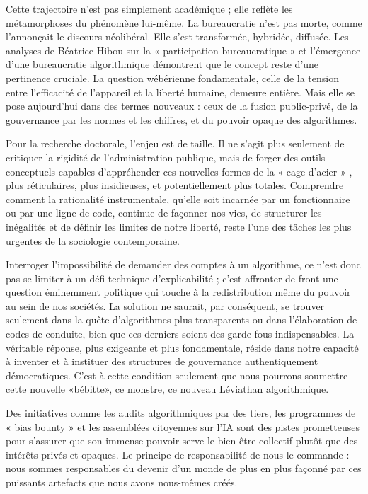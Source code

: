 Cette trajectoire n'est pas simplement académique ; elle reflète les métamorphoses du phénomène lui-même. La bureaucratie n'est pas morte, comme l'annonçait le discours néolibéral. Elle s'est transformée, hybridée, diffusée. Les analyses de Béatrice Hibou sur la « participation bureaucratique »  et l'émergence d'une bureaucratie algorithmique démontrent que le concept reste d'une pertinence cruciale. La question wébérienne fondamentale, celle de la tension entre l'efficacité de l'appareil et la liberté humaine, demeure entière. Mais elle se pose aujourd'hui dans des termes nouveaux : ceux de la fusion public-privé, de la gouvernance par les normes et les chiffres, et du pouvoir opaque des algorithmes.

Pour la recherche doctorale, l'enjeu est de taille. Il ne s'agit plus seulement de critiquer la rigidité de l'administration publique, mais de forger des outils conceptuels capables d'appréhender ces nouvelles formes de la « cage d'acier » , plus réticulaires, plus insidieuses, et potentiellement plus totales. Comprendre comment la rationalité instrumentale, qu'elle soit incarnée par un fonctionnaire ou par une ligne de code, continue de façonner nos vies, de structurer les inégalités et de définir les limites de notre liberté, reste l'une des tâches les plus urgentes de la sociologie contemporaine. 

Interroger l'impossibilité de demander des comptes à un algorithme, ce n'est donc pas se limiter à un défi technique d'explicabilité ; c'est affronter de front une question éminemment politique qui touche à la redistribution même du pouvoir au sein de nos sociétés. La solution ne saurait, par conséquent, se trouver seulement dans la quête d'algorithmes plus transparents ou dans l'élaboration de codes de conduite, bien que ces derniers soient des garde-fous indispensables. La véritable réponse, plus exigeante et plus fondamentale, réside dans notre capacité à inventer et à instituer des structures de gouvernance authentiquement démocratiques. C'est à cette condition seulement que nous pourrons soumettre cette {\large nouvelle} {\large «bébitte»}, ce {\LARGE monstre}, ce {\LARGE nouveau} {\huge Léviathan algorithmique}.

Des initiatives comme les audits algorithmiques par des tiers, les programmes de « bias bounty » et les assemblées citoyennes sur l'IA sont des pistes prometteuses pour s'assurer que son immense pouvoir serve le bien-être collectif plutôt que des intérêts privés et opaques. Le principe de responsabilité de \citet{Jonas1979} nous le commande : nous sommes responsables du devenir d'un monde de plus en plus façonné par ces puissants artefacts que nous avons nous-mêmes créés.

